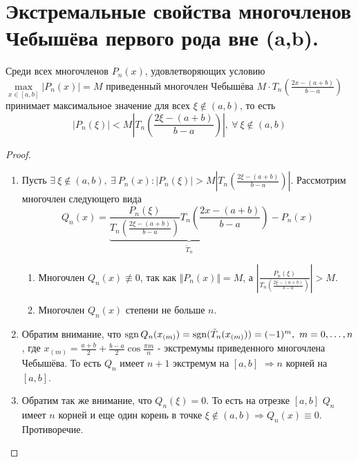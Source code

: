 \section{Экстремальные свойства многочленов Чебышёва
  первого рода вне (a,b).}

\begin{theorem}
  Среди всех многочленов $P_n(x)$, удовлетворяющих условию $\max\limits_{x\in[a,b]}|P_n(x)|=M$
  приведенный многочлен Чебышёва $M\cdot T_n\left(\frac{2x-(a+b)}{b-a}\right)$ принимает максимальное значение
  для всех $\xi\notin(a,b)$, то есть
  \[|P_n(\xi)|<M\left|T_n\left(\frac{2\xi-(a+b)}{b-a}\right)\right|,\ \forall\ \xi\notin(a,b)\]
\end{theorem}
\begin{proof}
  \begin{enumerate}
    \item Пусть $\exists\ \xi\notin(a,b),\ \exists\ P_n(x): |P_n(\xi)|>M\left|T_n\left(\frac{2\xi-(a+b)}{b-a}\right)\right|$. Рассмотрим многочлен следующего вида
          \[Q_n(x)=\underbrace{\frac{P_n(\xi)}{T_n\left(\frac{2\xi-(a+b)}{b-a}\right)}T_n\left(\frac{2x-(a+b)}{b-a}\right)}_{\tilde{T}_n} - P_n(x)\]
          \begin{enumerate}
            \item Многочлен $Q_n(x)\not\equiv0$, так как $\Vert P_n(x)\Vert=M$, а $\left|\frac{P_n(\xi)}{T_n\left(\frac{2\xi-(a+b)}{b-a}\right)}\right|>M$.
            \item Многочлен $Q_n(x)$ степени не больше $n$.
          \end{enumerate}
    \item Обратим внимание, что $\operatorname{sgn} Q_n(x_{(m)})=\operatorname{sgn}(\tilde{T}_n(x_{(m)}))=(-1)^m,\ m=0,\ldots,n$, где $x_{(m)}=\frac{a+b}{2}+\frac{b-a}{2}\cos\frac{\pi m}{n}$
          - экстремумы приведенного многочлена Чебышёва. То есть $Q_n$ имеет $n+1$ экстремум на $[a,b]$ $\Rightarrow n$ корней на $[a,b]$.
    \item Обратим так же внимание, что $Q_n(\xi)=0$. То есть на отрезке $[a,b]$
          $Q_n$ имеет $n$ корней и еще один корень в точке $\xi\notin(a,b)\Rightarrow Q_n(x)\equiv0$. Противоречие.
  \end{enumerate}
\end{proof}

